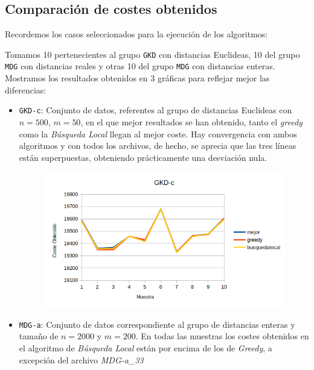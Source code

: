 \subsection{Comparación de costes obtenidos}

Recordemos los casos seleccionados para la ejecución de los algoritmos:

Tomamos 10 pertenecientes al grupo \texttt{GKD} con distancias Euclideas, 10 del grupo \texttt{MDG} con distancias reales y otras 10 del grupo \texttt{MDG} con distancias enteras. Mostramos los resultados obtenidos en 3 gráficas para reflejar mejor las diferencias:



\begin{itemize}
	\item \texttt{GKD-c}: Conjunto de datos, referentes al grupo de distancias Euclideas con $n=500$, $m=50$,  en el que mejor resultados se han obtenido, tanto el \textit{greedy} como la \textit{Búsqueda Local} llegan al mejor coste.  Hay convergencia con ambos algoritmos y con todos los archivos, de hecho, se aprecia que las tres líneas están superpuestas, obteniendo prácticamente una desviación nula.
	
	
	\begin{figure}[H]
		\centering
		\includegraphics[scale=0.55]{img/gkdc.png}
	\end{figure}
	
	
	
	
	\item \texttt{MDG-a}: Conjunto de datos correspondiente al grupo de distancias enteras y tamaño de $n=2000$ y $m=200$. En todas las muestras los costes obtenidos en el algoritmo de \textit{Búsqueda Local} están por encima de los de \textit{Greedy}, a excepción del archivo \textit{MDG-a\_33}
	

\end{itemize}
